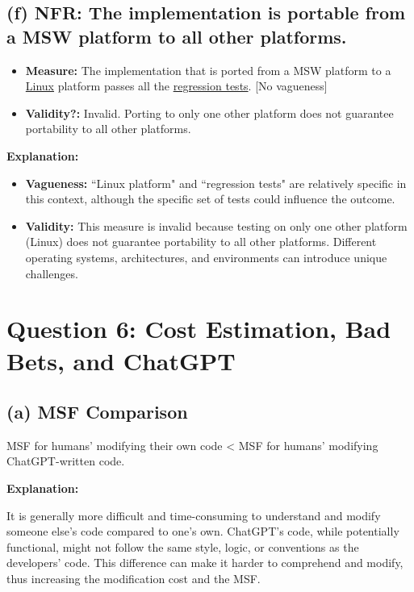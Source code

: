 \documentclass{article}
\begin{document}
\subsection*{(f) NFR: The implementation is portable from a MSW platform to all other platforms.}

\begin{itemize}
    \item \textbf{Measure:} The implementation that is ported from a MSW platform to a \underline{Linux} platform passes all the \underline{regression tests}. [No vagueness]
    \item \textbf{Validity?:} Invalid. Porting to only one other platform does not guarantee portability to all other platforms.
\end{itemize}

\textbf{Explanation:}

\begin{itemize}
    \item \textbf{Vagueness:} ``Linux platform" and ``regression tests" are relatively specific in this context, although the specific set of tests could influence the outcome.
    \item \textbf{Validity:} This measure is invalid because testing on only one other platform (Linux) does not guarantee portability to all other platforms. Different operating systems, architectures, and environments can introduce unique challenges.
\end{itemize}

\section*{Question 6: Cost Estimation, Bad Bets, and ChatGPT}

\subsection*{(a) MSF Comparison}

MSF for humans' modifying their own code < MSF for humans' modifying ChatGPT-written code. \checkmark

\textbf{Explanation:}

It is generally more difficult and time-consuming to understand and modify someone else's code compared to one's own. ChatGPT's code, while potentially functional, might not follow the same style, logic, or conventions as the developers' code. This difference can make it harder to comprehend and modify, thus increasing the modification cost and the MSF.
\end{document}
